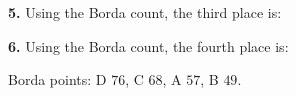 \documentclass[12pt]{ximera}
\begin{document}
\begin{problem}
\begin{prompt}
\textbf{5.} Using the Borda count, the third place is:
\begin{multipleChoice}
\end{multipleChoice}
\end{prompt}

\begin{prompt}
\textbf{6.} Using the Borda count, the fourth place is:
\begin{multipleChoice}
\end{multipleChoice}
\begin{feedback}
Borda points: D $76$, C $68$, A $57$, B $49$.
\end{feedback}
\end{prompt}
\end{problem}
\end{document}

